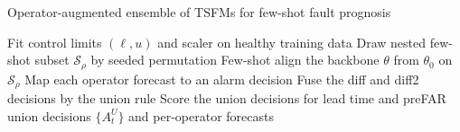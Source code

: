 \documentclass[border=8pt]{standalone}
\begin{document}
\begin{varwidth}{6.6in}
\begin{algorithm}[H]
\DontPrintSemicolon
\caption{Operator-augmented ensemble of TSFMs for few-shot fault prognosis}
\label{alg:operator-ensemble}
\BlankLine
Fit control limits $(\ell,u)$ and scaler on healthy training data 
Draw nested few-shot subset $\mathcal{S}_{\rho}$ by seeded permutation 
Few-shot align the backbone $\theta$ from $\theta_0$ on $\mathcal{S}_{\rho}$ 
Map each operator forecast to an alarm decision 
Fuse the diff and diff2 decisions by the union rule 
Score the union decisions for lead time and preFAR 
\Return union decisions $\{A_t^{U}\}$ and per-operator forecasts\;
\end{algorithm}
\end{varwidth}
\end{document}
